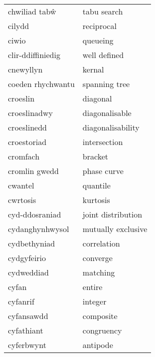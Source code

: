 \begin{supertabular}{p{0.22\textwidth}p{0.22\textwidth}}
                  chwiliad tabŵ &                      tabu search \\
                         cilydd &                       reciprocal \\
                          ciwio &                         queueing \\
              clir-ddiffiniedig &                     well defined \\
                      cnewyllyn &                           kernal \\
              coeden rhychwantu &                    spanning tree \\
                       croeslin &                         diagonal \\
                   croeslinadwy &                   diagonalisable \\
                    croeslinedd &                diagonalisability \\
                    croestoriad &                     intersection \\
                       cromfach &                          bracket \\
                  cromlin gwedd &                      phase curve \\
                        cwantel &                         quantile \\
                       cwrtosis &                         kurtosis \\
                 cyd-ddosraniad &               joint distribution \\
                cydanghynhwysol &               mutually exclusive \\
                   cydbethyniad &                      correlation \\
                    cydgyfeirio &                         converge \\
                     cydweddiad &                         matching \\
                          cyfan &                           entire \\
                       cyfanrif &                          integer \\
                     cyfansawdd &                        composite \\
                     cyfathiant &                       congruency \\
                     cyferbwynt &                         antipode \\

\end{supertabular}

